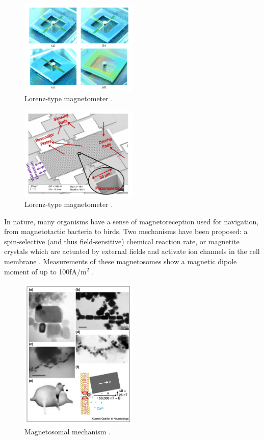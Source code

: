 \begin{figure}[h]
\centering
\includegraphics[width=0.5\textwidth]{lorenz}
\caption{Lorenz-type magnetometer \cite{sinha201627}.}
\label{fig:nd_lorenz}
\end{figure}

\begin{figure}[h]
\centering
\includegraphics[width=0.5\textwidth]{lorenz2}
\caption{Lorenz-type magnetometer \cite{kumar2015ultra}.}
\label{fig:lorenz}
\end{figure}

In nature, many organisms have a sense of magnetoreception used for navigation, from magnetotactic bacteria to birds. Two mechanisms have been proposed: a spin-selective (and thus field-sensitive) chemical reaction rate, or magnetite crystals which are actuated by external fields and activate ion channels in the cell membrane \cite{johnsen2005physics,dodson2013radical,kirschvink2001magnetite}. Measurements of these magnetosomes show a magnetic dipole moment of up to 100fA/m$^2$ \cite{hanzlik2002pulsed,eder2012magnetic}.

\begin{figure}
\centering
\includegraphics[width=0.5\textwidth]{kirsh2001}
\caption{Magnetosomal mechanism \cite{kirschvink2001magnetite}.}
\label{fig:magnetsosome}
\end{figure}

